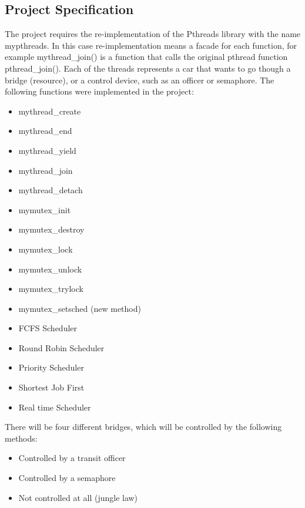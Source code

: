 \documentclass[a4paper,9pt]{article}
\begin{document}
\subsection{Project Specification}

The project requires the re-implementation of the Pthreads library with the name mypthreads. In this case re-implementation means a facade for each function, for example mythread\_join() is a function that calls the original pthread function pthread\_join(). Each of the threads represents a car that wants to go though a bridge (resource), or a control device, such as an officer or semaphore. The following functions were implemented in the project:
\begin{itemize}
\item mythread\_create


\item mythread\_end




\item mythread\_yield



\item mythread\_join



\item mythread\_detach



\item mymutex\_init
\item mymutex\_destroy
\item mymutex\_lock
\item mymutex\_unlock
\item mymutex\_trylock
\item mymutex\_setsched (new method)
\end{itemize}





\begin{itemize}
\item FCFS Scheduler
\item Round Robin Scheduler
\item Priority Scheduler
\item Shortest Job First
\item Real time Scheduler
\end{itemize}

There will be four different bridges, which will be controlled by the following methods:
\begin{itemize}
\item Controlled by a transit officer
\item Controlled by a semaphore
\item Not controlled at all (jungle law)
\end{itemize}
\end{document}
